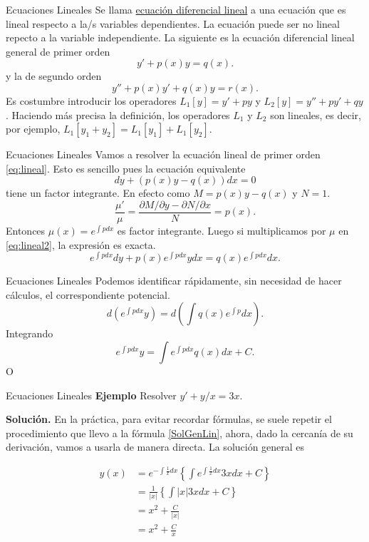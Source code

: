 \documentclass{article}
\begin{document}
{Ecuaciones Lineales}
Se llama \href{http://es.wikipedia.org/wiki/Ecuación_diferencial_lineal}{ecuación diferencial lineal} a una ecuación que es lineal
respecto a   la/s variables
dependientes. La ecuación puede ser no lineal repecto a la variable independiente. 
La siguiente es la ecuación diferencial lineal general de primer orden
\begin{equation}\label{eq:lineal}y'+p(x)y=q(x).
\end{equation}
y la  de segundo orden
\[y''+p(x)y'+q(x)y=r(x).\]
Es costumbre introducir los operadores  $L_1[y]=y'+py$  y $ L_2[y]=y''+py'+qy$. 
Haciendo más precisa la definición, los operadores $L_1$ y $L_2$ son lineales, es decir, por ejemplo, $L_1[y_1+y_2]=L_1[y_1]+L_1[y_2]$. 


{Ecuaciones Lineales}
 Vamos a resolver la ecuación lineal de primer orden \eqref{eq:lineal}. Esto es sencillo pues la ecuación equivalente
 \begin{equation}\label{eq:lineal2}dy+(p(x)y-q(x))dx=0
  \end{equation}
tiene un factor integrante. En efecto como $M=p(x)y-q(x)$ y $N=1$. 
 \[\frac{\mu'}{\mu}=\frac{\partial M/\partial y-\partial N/\partial x}{N}=p(x).\]
 Entonces $\mu(x)=e^{\int pdx}$ es factor integrante. Luego si multiplicamos por $\mu$ en \eqref{eq:lineal2},  la expresión  es exacta. 
 \[e^{\int pdx}dy+p(x)e^{\int pdx}ydx=q(x)e^{\int pdx}dx.\]


{Ecuaciones Lineales}
Podemos identificar rápidamente, sin necesidad de hacer cálculos, el correspondiente potencial.
 \[d\left(e^{\int pdx}y\right)=d\left(\int q(x)e^{\int p} dx \right).\]
Integrando
\[e^{\int pdx}y=\int e^{\int pdx}q(x)dx+C.
 \]
 O
 
 
 
 



{Ecuaciones Lineales}
\textbf{Ejemplo} Resolver $y'+y/x=3x$. 

\textbf{Solución.} En la práctica, para evitar recordar fórmulas, se suele repetir el procedimiento que llevo a la fórmula \eqref{SolGenLin}, ahora, dado la cercanía
de su derivación, vamos a usarla  de manera directa. La solución general es

\[\begin{split} y(x)&=e^{-\int\frac{1}{x}dx}\left\{\int e^{\int\frac{1}{x}dx}3xdx+C\right\}\\
   &=\frac{1}{|x|}\left\{\int |x| 3xdx+C\right\}\\
   &=x^2+\frac{C}{|x|}\\
   &=x^2+\frac{C}{x}\\
  \end{split}
\]
 
\end{document}
